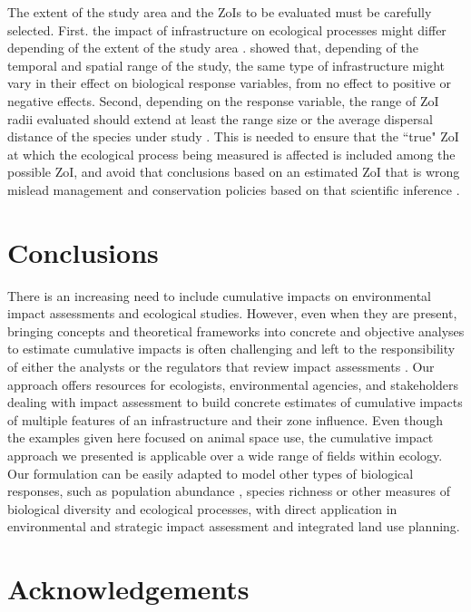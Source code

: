 \documentclass[titlepage]{article}
\begin{document}
The extent of the study area and the ZoIs to be evaluated must be carefully selected. First. the impact of infrastructure on ecological processes might differ depending of the extent of the study area \citep{vistnes_matter_2008}. \citet{skarin_human_2014} showed that, depending of the temporal and spatial range of the study, the same type of infrastructure might vary in their effect on biological response variables, from no effect to positive or negative effects. Second, depending on the response variable, the range of ZoI radii evaluated should extend at least the range size or the average dispersal distance of the species under study \citep{jackson_what_2012}. This is needed to ensure that the ``true" ZoI at which the ecological process being measured is affected is included among the possible ZoI, and avoid that conclusions based on an estimated ZoI that is wrong mislead management and conservation policies based on that scientific inference \citep[e.g.][]{jackson_are_2015}.

\section{Conclusions}

There is an increasing need to include cumulative impacts on environmental impact assessments and ecological studies. However, even when they are present, bringing concepts and theoretical frameworks into concrete and objective analyses to estimate cumulative impacts is often challenging and left to the responsibility of either the analysts or the regulators that review impact assessments \citep{johnson_regulating_2011}. Our approach offers resources for ecologists, environmental agencies, and stakeholders dealing with impact assessment to build concrete estimates of cumulative impacts of multiple features of an infrastructure and their zone influence. 
Even though the examples given here focused on animal space use, the cumulative impact approach we presented is applicable over a wide range
of fields within ecology. Our formulation can be easily adapted to model other types of biological responses, such as population abundance \citep[e.g.][]{benitez-lopez_impacts_2010}, species richness \citep[e.g.][]{ficetola_ecological_2009} or other measures of biological diversity and ecological processes, with direct application in environmental and strategic impact assessment and integrated land use planning.
      
\section*{Acknowledgements}
\end{document}
